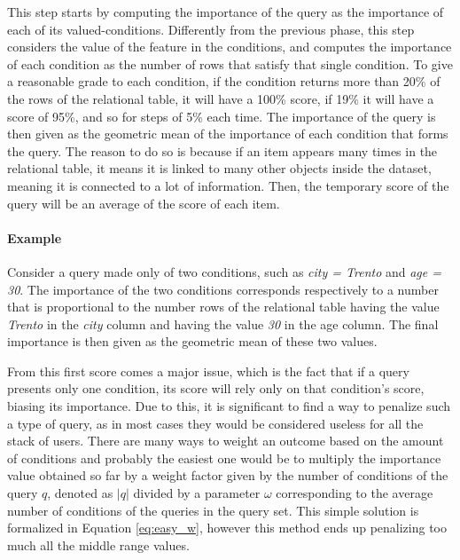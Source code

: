This step starts by computing the importance of the query as the importance of each of its valued-conditions. Differently from the previous phase, this step considers the value of the feature in the conditions, and computes the importance of each condition as the number of rows that satisfy that single condition. To give a reasonable grade to each condition, if the condition returns more than 20\% of the rows of the relational table, it will have a 100\% score, if 19\% it will have a score of 95\%, and so for steps of 5\% each time. The importance of the query is then given as the geometric mean of the importance of each condition that forms the query. The reason to do so is because if an item appears many times in the relational table, it means it is linked to many other objects inside the dataset, meaning it is connected to a lot of information. Then, the temporary score of the query will be an average of the score of each item.






\paragraph{Example} Consider a query made only of two conditions, such as \emph{city = Trento} and \emph{age = 30}. The importance of the two conditions corresponds respectively to a number that is proportional to the number rows of the relational table having the value \emph{Trento} in the \emph{city} column and having the value \emph{30} in the age column. The final  importance is then given as the geometric mean of these two values.

\vspace{1em}

From this first score comes a major issue, which is the fact that if a query presents only one condition, its score will rely only on that condition's score, biasing its importance. Due to this, it is significant to find a way to penalize such a type of query, as in most cases they would be considered useless for all the stack of users.
There are many ways to weight an outcome based on the amount of conditions and probably the easiest one would be to multiply the importance value obtained so far by a weight factor given  by the number of conditions of the query $q$, denoted as $|q|$ divided by a parameter $\omega$ corresponding to the average number of conditions of the queries in the query set. This simple solution is formalized in Equation \ref{eq:easy_w}, however this method ends up penalizing too much all the middle range values.

